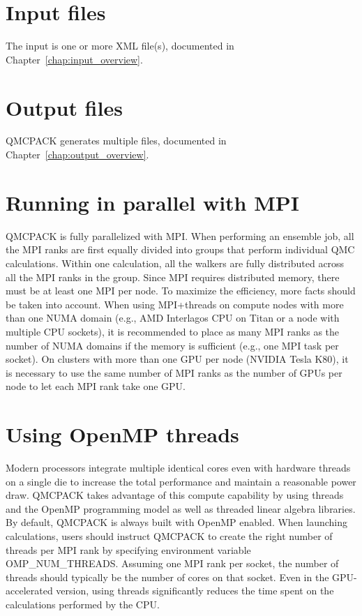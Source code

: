 \section{Input files}
\label{sec:inputs}
The input is one or more XML file(s), documented in Chapter~\ref{chap:input_overview}.

\section{Output files}
QMCPACK generates multiple files, documented in Chapter~\ref{chap:output_overview}.

\section{Running in parallel with MPI}
\label{sec:parallelrunning}

QMCPACK is fully parallelized with MPI. When performing an ensemble job, all
the MPI ranks are first equally divided into groups that perform individual
QMC calculations. Within one calculation, all the walkers are fully distributed
across all the MPI ranks in the group. Since MPI requires distributed memory,
there must be at least one MPI per node. To maximize the efficiency, more facts
should be taken into account. When using MPI+threads on compute nodes with more
than one NUMA domain (e.g., AMD Interlagos CPU on Titan or a node with multiple
CPU sockets), it is recommended to place as many MPI ranks as the number of
NUMA domains if the memory is sufficient (e.g., one MPI task per socket). On clusters with more than one
GPU per node (NVIDIA Tesla K80), it is necessary to use the same number of MPI
ranks as the number of GPUs per node to let each MPI rank take one GPU.

\section{Using OpenMP threads}
\label{sec:openmprunning}
Modern processors integrate multiple identical cores even with
hardware threads on a single die to increase the total performance and
maintain a reasonable power draw. QMCPACK takes advantage of this
compute capability by using threads and the OpenMP programming model
as well as threaded linear algebra libraries. By default, QMCPACK is
always built with OpenMP enabled. When launching calculations, users
should instruct QMCPACK to create the right number of threads per MPI
rank by specifying environment variable OMP\_NUM\_THREADS. Assuming
one MPI rank per socket, the number of threads should typically be the
number of cores on that socket. Even in the GPU-accelerated version,
using threads significantly reduces the time spent on the calculations
performed by the CPU.

